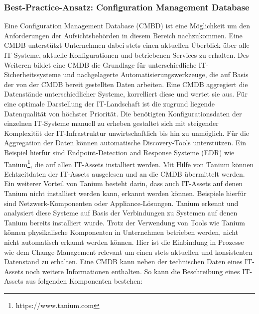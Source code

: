\subsubsection{Best-Practice-Ansatz: Configuration Management Database}
Eine \glqq{}Configuration Management Database\grqq{} (CMBD) ist eine Möglichkeit um den Anforderungen der Aufsichtsbehörden in diesem Bereich nachzukommen. Eine CMDB unterstützt Unternehmen dabei stets einen aktuellen Überblick über alle IT-Systeme, aktuelle Konfigurationen und betriebenen Services zu erhalten. Des Weiteren bildet eine CMDB die Grundlage für unterschiedliche IT-Sicherheitssysteme und nachgelagerte Automatisierungswerkzeuge, die auf Basis der von der CMDB bereit gestellten Daten arbeiten. Eine CMDB aggregiert  die Datenstände unterschiedlicher Systeme, korrelliert diese und wertet sie aus. 
\bigbreak
Für eine optimale Darstellung der IT-Landschaft ist die zugrund liegende Datenqualität von höchster Priorität. Die benötigten Konfigurationsdaten der einzelnen IT-Systeme manuell zu erheben gestaltet sich mit steigender Komplexität der IT-Infrastruktur unwirtschaftlich bis hin zu unmöglich. Für die Aggregation der Daten können automatische Discovery-Tools unterstützen. Ein Beispiel hierfür sind \glqq{}Endpoint-Detection and Response Systeme\grqq{} (EDR) wie Tanium\footnote{https://www.tanium.com}, die auf allen IT-Assets installiert werden. Mit Hilfe von Tanium können Echtzeitdaten der IT-Assets ausgelesen und an die CMDB übermittelt werden. Ein weiterer Vorteil von Tanium besteht darin, dass auch IT-Assets auf denen Tanium nicht installiert werden kann, erkannt werden können. Beispiele hierfür sind Netzwerk-Komponenten oder Appliance-Lösungen. Tanium erkennt und analysiert diese Systeme auf Basis der Verbindungen zu Systemen auf denen Tanium bereits installiert wurde. 
\bigbreak
Trotz der Verwendung von Tools wie Tanium können physikalische Komponenten in Unternehmen betrieben werden, nicht nicht automatisch erkannt werden können. Hier ist die Einbindung in Prozesse wie dem Change-Management relevant um einen stets aktuellen und konsistenten Datenstand zu erhalten. Eine CMDB kann neben der technischen Daten eines IT-Assets noch weitere Informationen enthalten. So kann die Beschreibung eines IT-Assets aus folgenden Komponenten bestehen:

